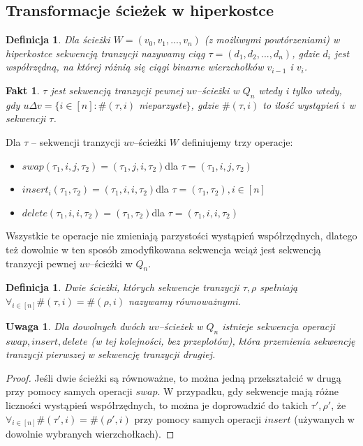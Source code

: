 \documentclass{pracamgr}
\newtheorem{defi}[theorem]{Definicja}
\newtheorem{remark}[theorem]{Uwaga}
\newtheorem{fact}[theorem]{Fakt}
\begin{document}
  \subsection{Transformacje ścieżek w hiperkostce}
   \begin{defi}\label{sekwencja tranzycji}
     Dla ścieżki $W=(v_0,v_1,...,v_n)$ (z możliwymi powtórzeniami) w hiperkostce \emph{sekwencją tranzycji} nazywamy ciąg $\tau=(d_1,d_2,...,d_n)$,
     gdzie $d_i$ jest współrzędną, na której różnią się ciągi binarne wierzchołków $v_{i-1}$ i $v_i$.
    \end{defi}
    \begin{fact}\label{sekwencja tranzycji - parzystość}
     $\tau$ jest sekwencją tranzycji pewnej $uv$--ścieżki w $Q_n$ wtedy i tylko wtedy, gdy\newline
     $u\Delta v=\{i\in[n]:\#(\tau,i)$ nieparzyste$\}$,
     gdzie $\#(\tau,i)$ to ilość wystąpień $i$ w sekwencji $\tau$.
    \end{fact}
    \noindent
    Dla $\tau$ -- sekwencji tranzycji $uv$--ścieżki $W$ definiujemy trzy operacje:
    \begin{itemize}
     \item $swap(\tau_1,i,j,\tau_2)=(\tau_1,j,i,\tau_2)$\quad dla $\tau=(\tau_1,i,j,\tau_2)$
     \item $insert_i(\tau_1,\tau_2)=(\tau_1,i,i,\tau_2)$\quad dla $\tau=(\tau_1,\tau_2),i\in[n]$
     \item $delete(\tau_1,i,i,\tau_2)=(\tau_1,\tau_2)$\quad dla $\tau=(\tau_1,i,i,\tau_2)$
    \end{itemize}
    Wszystkie te operacje nie zmieniają parzystości wystąpień współrzędnych, dlatego też dowolnie w ten sposób zmodyfikowana sekwencja
    wciąż jest sekwencją tranzycji pewnej $uv$--ścieżki w $Q_n$.
    \begin{defi}\label{sciezki rownowazne}
     Dwie ścieżki, których sekwencje tranzycji $\tau,\rho$ spełniają $\forall_{i\in[n]}\#(\tau,i)=\#(\rho,i)$ nazywamy \emph{równoważnymi}.
    \end{defi}
    \begin{remark}\label{przeksztalcanie sciezek}
     Dla dowolnych dwóch $uv$--ścieżek w $Q_n$ istnieje sekwencja operacji\newline
     $swap, insert, delete$ (w tej kolejności, bez przeplotów),
     która przemienia sekwencję tranzycji pierwszej w sekwencję tranzycji drugiej.
    \end{remark}
    \begin{proof}
     Jeśli dwie ścieżki są równoważne, to można jedną przekształcić w drugą przy pomocy samych operacji $swap$.\newline
     W przypadku, gdy sekwencje mają różne liczności wystąpień współrzędnych, to można je doprowadzić do takich $\tau',\rho'$,
     że $\forall_{i\in[n]}\#(\tau',i)=\#(\rho',i)$ przy pomocy samych operacji $insert$ (używanych w dowolnie wybranych wierzchołkach).
    \end{proof}
\end{document}
